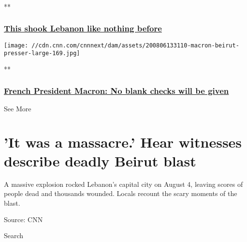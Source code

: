 **

\hypertarget{this-shook-lebanon-like-nothing-before}{%
\subsubsection{\texorpdfstring{\href{/videos/world/2020/08/06/beirut-explosion-arwa-damon-lon-orig.cnn/video/playlists/beirut-explosion/}{This
shook Lebanon like nothing
before}}{This shook Lebanon like nothing before}}\label{this-shook-lebanon-like-nothing-before}}

\href{/videos/world/2020/08/06/emmanuel-macron-lebanon-leaders-blank-check-sot-vpx.afptv/video/playlists/beirut-explosion/}{}

\texttt{[image: //cdn.cnn.com/cnnnext/dam/assets/200806133110-macron-beirut-presser-large-169.jpg]}

**

\hypertarget{french-president-macron-no-blank-checks-will-be-given}{%
\subsubsection{\texorpdfstring{\href{/videos/world/2020/08/06/emmanuel-macron-lebanon-leaders-blank-check-sot-vpx.afptv/video/playlists/beirut-explosion/}{French
President Macron: No blank checks will be
given}}{French President Macron: No blank checks will be given}}\label{french-president-macron-no-blank-checks-will-be-given}}

See More

\hypertarget{it-was-a-massacre-hear-witnesses-describe-deadly-beirut-blast-2}{%
\section{'It was a massacre.' Hear witnesses describe deadly Beirut
blast}\label{it-was-a-massacre-hear-witnesses-describe-deadly-beirut-blast-2}}

A massive explosion rocked Lebanon's capital city on August 4, leaving
scores of people dead and thousands wounded. Locals recount the scary
moments of the blast.

Source: CNN

Search

